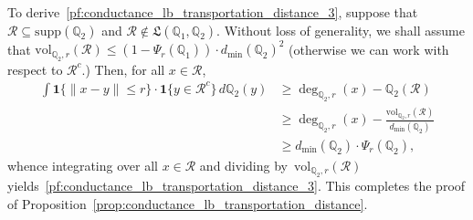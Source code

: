 \documentclass[twoside,11pt]{article}
\newcommand{\1}{\mathbf{1}}
\newcommand{\mc}[1]{\mathcal{#1}}
\newcommand{\mbb}[1]{\mathbb{#1}}
\newcommand{\Qbb}{\mathbb{Q}}
\newcommand{\vol}{\mathrm{vol}}
\begin{document}
To derive~\eqref{pf:conductance_lb_transportation_distance_3}, suppose that $\mc{R} \subseteq \mathrm{supp}(\mbb{Q}_2)$ and $\mc{R} \not\in \mathfrak{L}(\mbb{Q}_1,\mbb{Q}_2)$. Without loss of generality, we shall assume that $\vol_{\mbb{Q}_2,r}(\mc{R}) \leq (1 - \Psi_r(\mbb{Q}_1)) \cdot d_{\min}(\mbb{Q}_2)^2$ (otherwise we can work with respect to $\mc{R}^c$.)  Then, for all $x \in \mc{R}$,
\begin{align*}
\int \1\{\|x - y\| \leq r\}\cdot \1\{y \in \mc{R}^c\} \,d\mbb{Q}_2(y) & \geq \deg_{\Qbb_2,r}(x) -  \mbb{Q}_2(\mc{R}) \\
& \geq \deg_{\Qbb_2,r}(x) - \frac{\vol_{\mbb{Q}_2,r}(\mc{R})}{d_{\min}(\mbb{Q}_2)} \\
& \geq d_{\min}(\mbb{Q}_2) \cdot \Psi_{r}(\mbb{Q}_2),
\end{align*}
whence integrating over all $x \in \mc{R}$ and dividing by~$\vol_{\mbb{Q}_2,r}(\mc{R})$ yields~\eqref{pf:conductance_lb_transportation_distance_3}. This completes the proof of Proposition~\ref{prop:conductance_lb_transportation_distance}. \\
\end{document}
